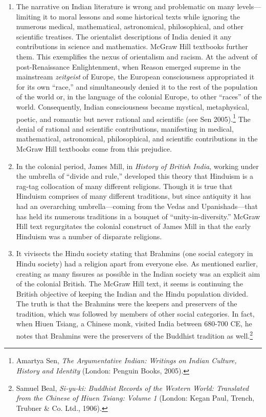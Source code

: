 \begin{enumerate}
\item The narrative on Indian literature is wrong and problematic on many levels—limiting it to moral lessons and some historical texts while ignoring the numerous medical, mathematical, astronomical, philosophical, and other scientific treatises. The orientalist descriptions of India denied it any contributions in science and mathematics. McGraw Hill textbooks further them. This exemplifies the nexus of orientalism and racism. At the advent of post-Renaissance Enlightenment, when Reason emerged supreme in the mainstream \textit{zeitgeist} of Europe, the European consciousness appropriated it for its own “race,” and simultaneously denied it to the rest of the population of the world or, in the language of the colonial Europe, to other “races” of the world. Consequently, Indian consciousness became mystical, metaphysical, poetic, and romantic but never rational and scientific (see Sen 2005).\footnote{Amartya Sen, \textit{The Argumentative Indian: Writings on Indian Culture, History and Identity} (London: Penguin Books, 2005).} The denial of rational and scientific contributions, manifesting in medical, mathematical, astronomical, philosophical, and scientific contributions in the McGraw Hill textbooks come from this prejudice. 

\item In the colonial period, James Mill, in \textit{History of British India}, working under the umbrella of “divide and rule,” developed this theory that Hinduism is a rag-tag collocation of many different religions. Though it is true that Hinduism comprises of many different traditions, but since antiquity it has had an overarching umbrella—coming from the Vedas and Upanishads—that has held its numerous traditions in a bouquet of “unity-in-diversity.” McGraw Hill text regurgitates the colonial construct of James Mill in that the early Hinduism was a number of disparate religions.

\item It vivisects the Hindu society stating that Brahmins (one social category in Hindu society) had a religion apart from everyone else. As mentioned earlier, creating as many fissures as possible in the Indian society was an explicit aim of the colonial British. The McGraw Hill text, it seems is continuing the British objective of keeping the Indian and the Hindu population divided. The truth is that the Brahmins were the keepers and preservers of the tradition, which was followed by members of other social categories. In fact, when Hiuen Tsiang, a Chinese monk, visited India between 680-700 CE, he notes that Brahmins were the preservers of the Buddhist tradition as well.\footnote{Samuel Beal, \textit{Si-yu-ki: Buddhist Records of the Western World: Translated from the Chinese of Hiuen Tsiang: Volume 1} (London: Kegan Paul, Trench, Trubner \& Co. Ltd., 1906).} 


\end{enumerate}
